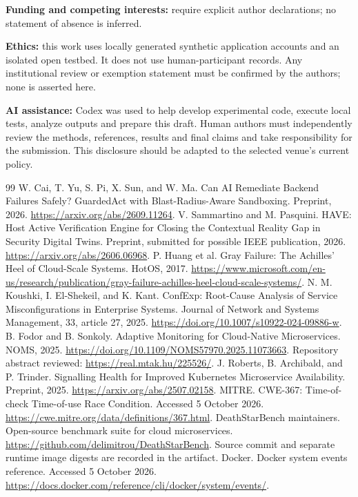 \documentclass[manuscript,review,nonacm]{acmart}
\begin{document}
\textbf{Funding and competing interests:} require explicit author declarations; no statement of absence is inferred.

\textbf{Ethics:} this work uses locally generated synthetic application accounts and an isolated open testbed. It does not use human-participant records. Any institutional review or exemption statement must be confirmed by the authors; none is asserted here.

\textbf{AI assistance:} Codex was used to help develop experimental code, execute local tests, analyze outputs and prepare this draft. Human authors must independently review the methods, references, results and final claims and take responsibility for the submission. This disclosure should be adapted to the selected venue's current policy.

\begin{thebibliography}{99}
 W. Cai, T. Yu, S. Pi, X. Sun, and W. Ma. Can AI Remediate Backend Failures Safely? GuardedAct with Blast-Radius-Aware Sandboxing. Preprint, 2026. \url{https://arxiv.org/abs/2609.11264}.
 V. Sammartino and M. Pasquini. HAVE: Host Active Verification Engine for Closing the Contextual Reality Gap in Security Digital Twins. Preprint, submitted for possible IEEE publication, 2026. \url{https://arxiv.org/abs/2606.06968}.
 P. Huang et al. Gray Failure: The Achilles' Heel of Cloud-Scale Systems. HotOS, 2017. \url{https://www.microsoft.com/en-us/research/publication/gray-failure-achilles-heel-cloud-scale-systems/}.
 N. M. Koushki, I. El-Shekeil, and K. Kant. ConfExp: Root-Cause Analysis of Service Misconfigurations in Enterprise Systems. Journal of Network and Systems Management, 33, article 27, 2025. \url{https://doi.org/10.1007/s10922-024-09886-w}.
 B. Fodor and B. Sonkoly. Adaptive Monitoring for Cloud-Native Microservices. NOMS, 2025. \url{https://doi.org/10.1109/NOMS57970.2025.11073663}. Repository abstract reviewed: \url{https://real.mtak.hu/225526/}.
 J. Roberts, B. Archibald, and P. Trinder. Signalling Health for Improved Kubernetes Microservice Availability. Preprint, 2025. \url{https://arxiv.org/abs/2507.02158}.
 MITRE. CWE-367: Time-of-check Time-of-use Race Condition. Accessed 5 October 2026. \url{https://cwe.mitre.org/data/definitions/367.html}.
 DeathStarBench maintainers. Open-source benchmark suite for cloud microservices. \url{https://github.com/delimitrou/DeathStarBench}. Source commit and separate runtime image digests are recorded in the artifact.
 Docker. Docker system events reference. Accessed 5 October 2026. \url{https://docs.docker.com/reference/cli/docker/system/events/}.
\end{thebibliography}
\end{document}
